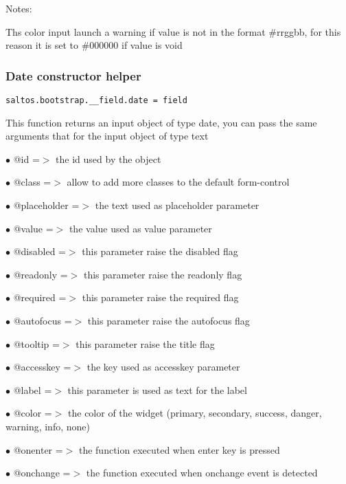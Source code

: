 \documentclass[a4paper]{article}
\begin{document}
Notes:

Ths color input launch a warning if value is not in the format \#rrggbb,
for this reason it is set to \#000000 if value is void

\hypertarget{toc613}{}
\subsubsection{Date constructor helper}

\begin{lstlisting}
saltos.bootstrap.__field.date = field
\end{lstlisting}

This function returns an input object of type date, you can pass the same arguments
that for the input object of type text

\begin{compactitem}
\item[\color{myblue}$\bullet$] @id          =$>$ the id used by the object
\item[\color{myblue}$\bullet$] @class       =$>$ allow to add more classes to the default form-control
\item[\color{myblue}$\bullet$] @placeholder =$>$ the text used as placeholder parameter
\item[\color{myblue}$\bullet$] @value       =$>$ the value used as value parameter
\item[\color{myblue}$\bullet$] @disabled    =$>$ this parameter raise the disabled flag
\item[\color{myblue}$\bullet$] @readonly    =$>$ this parameter raise the readonly flag
\item[\color{myblue}$\bullet$] @required    =$>$ this parameter raise the required flag
\item[\color{myblue}$\bullet$] @autofocus   =$>$ this parameter raise the autofocus flag
\item[\color{myblue}$\bullet$] @tooltip     =$>$ this parameter raise the title flag
\item[\color{myblue}$\bullet$] @accesskey   =$>$ the key used as accesskey parameter
\item[\color{myblue}$\bullet$] @label       =$>$ this parameter is used as text for the label
\item[\color{myblue}$\bullet$] @color       =$>$ the color of the widget (primary, secondary, success, danger, warning, info, none)
\item[\color{myblue}$\bullet$] @onenter     =$>$ the function executed when enter key is pressed
\item[\color{myblue}$\bullet$] @onchange    =$>$ the function executed when onchange event is detected
\end{compactitem}
\end{document}
